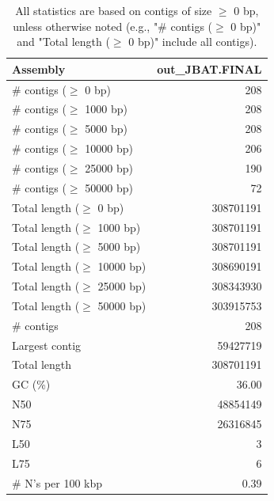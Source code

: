 \documentclass[12pt,a4paper]{article}
\begin{document}
\begin{table}[ht]
\begin{center}
\caption{All statistics are based on contigs of size $\geq$ 0 bp, unless otherwise noted (e.g., "\# contigs ($\geq$ 0 bp)" and "Total length ($\geq$ 0 bp)" include all contigs).}
\begin{tabular}{|l*{1}{|r}|}
\hline
Assembly & out\_JBAT.FINAL \\ \hline
\# contigs ($\geq$ 0 bp) & 208 \\ \hline
\# contigs ($\geq$ 1000 bp) & 208 \\ \hline
\# contigs ($\geq$ 5000 bp) & 208 \\ \hline
\# contigs ($\geq$ 10000 bp) & 206 \\ \hline
\# contigs ($\geq$ 25000 bp) & 190 \\ \hline
\# contigs ($\geq$ 50000 bp) & 72 \\ \hline
Total length ($\geq$ 0 bp) & 308701191 \\ \hline
Total length ($\geq$ 1000 bp) & 308701191 \\ \hline
Total length ($\geq$ 5000 bp) & 308701191 \\ \hline
Total length ($\geq$ 10000 bp) & 308690191 \\ \hline
Total length ($\geq$ 25000 bp) & 308343930 \\ \hline
Total length ($\geq$ 50000 bp) & 303915753 \\ \hline
\# contigs & 208 \\ \hline
Largest contig & 59427719 \\ \hline
Total length & 308701191 \\ \hline
GC (\%) & 36.00 \\ \hline
N50 & 48854149 \\ \hline
N75 & 26316845 \\ \hline
L50 & 3 \\ \hline
L75 & 6 \\ \hline
\# N's per 100 kbp & 0.39 \\ \hline
\end{tabular}
\end{center}
\end{table}
\end{document}
